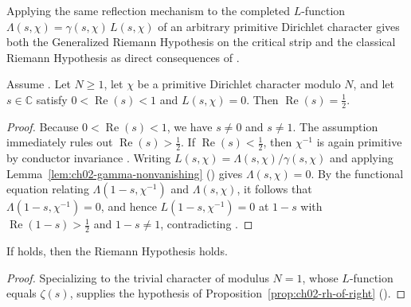 Applying the same reflection mechanism to the completed $L$-function
$\Lambda(s, \chi) = \gamma(s, \chi)\,L(s, \chi)$ of an arbitrary primitive
Dirichlet character gives both the Generalized Riemann Hypothesis on the
critical strip and the classical Riemann Hypothesis as direct consequences of
.

\begin{theorem}
\label{thm:ch02-crit-line}
Assume .
Let $N \ge 1$, let $\chi$ be a primitive Dirichlet character modulo $N$, and
let $s \in \mathbb{C}$ satisfy $0 < \operatorname{Re}(s) < 1$ and
$L(s, \chi) = 0$.
Then $\operatorname{Re}(s) = \tfrac{1}{2}$.
\end{theorem}

\begin{proof}
Because $0 < \operatorname{Re}(s) < 1$, we have $s \neq 0$ and $s \neq 1$.
The assumption  immediately rules out
$\operatorname{Re}(s) > \tfrac{1}{2}$.
If $\operatorname{Re}(s) < \tfrac{1}{2}$, then $\chi^{-1}$ is again primitive
by conductor invariance .
Writing $L(s, \chi) = \Lambda(s, \chi) / \gamma(s, \chi)$ and applying
Lemma~\ref{lem:ch02-gamma-nonvanishing} ()
gives $\Lambda(s, \chi) = 0$.
By the functional equation relating $\Lambda(1 - s, \chi^{-1})$ and
$\Lambda(s, \chi)$, it follows that $\Lambda(1 - s, \chi^{-1}) = 0$, and hence
$L(1 - s, \chi^{-1}) = 0$ at $1 - s$ with $\operatorname{Re}(1 - s) > \tfrac{1}{2}$
and $1 - s \neq 1$, contradicting .
\end{proof}

\begin{corollary}
\label{cor:ch02-rh-of-every}
If  holds, then the Riemann Hypothesis
holds.
\end{corollary}

\begin{proof}
Specializing  to the trivial character of
modulus $N = 1$, whose $L$-function equals $\zeta(s)$, supplies the hypothesis
of Proposition~\ref{prop:ch02-rh-of-right} ().
\end{proof}

